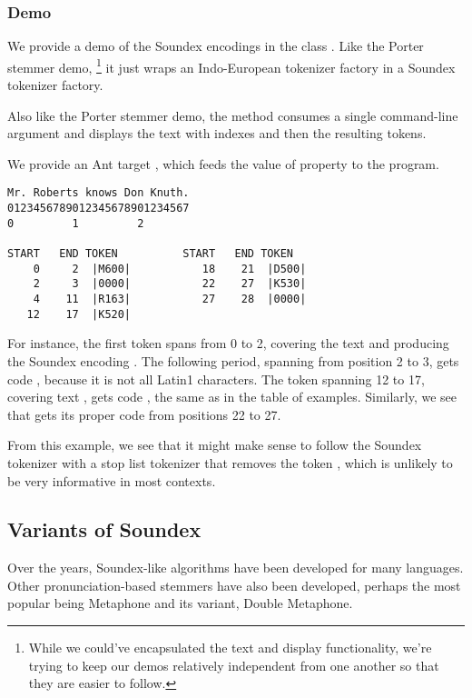\subsubsection{Demo}

We provide a demo of the Soundex encodings in the class
.  Like the Porter stemmer demo,%
%
\footnote{While we could've encapsulated the text and display
functionality, we're trying to keep our demos relatively
independent from one another so that they are easier to follow.}
%
it just wraps an Indo-European tokenizer factory in a Soundex
tokenizer factory.
%
%

Also like the Porter stemmer demo, the  method
consumes a single command-line argument and displays the
text with indexes and then the resulting tokens.  

We provide an Ant target , which 
feeds the value of property  to the program.
%
\begin{verbatim}
Mr. Roberts knows Don Knuth.
0123456789012345678901234567
0         1         2

START   END TOKEN          START   END TOKEN
    0     2  |M600|           18    21  |D500|
    2     3  |0000|           22    27  |K530|
    4    11  |R163|           27    28  |0000|
   12    17  |K520|
\end{verbatim}
%
For instance, the first token spans from 0 to 2,
covering the text  and producing
the Soundex encoding .  The following
period, spanning from position 2 to 3, gets code
, because it is not all Latin1 characters.
The token spanning 12 to 17, covering text ,
gets code , the same as  in the table
of examples.  Similarly, we see that  gets its
proper code from positions 22 to 27.

From this example, we see that it might make sense to follow the
Soundex tokenizer with a stop list tokenizer that removes the token
, which is unlikely to be very informative in most
contexts.


\subsection{Variants of Soundex}

Over the years, Soundex-like algorithms have been developed for many
languages.  Other pronunciation-based stemmers have also been
developed, perhaps the most popular being Metaphone and its variant,
Double Metaphone.


